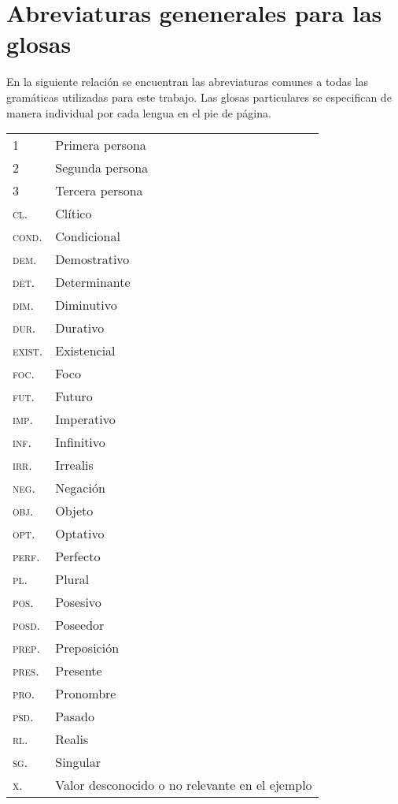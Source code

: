 \section*{Abreviaturas genenerales para las glosas}

\noindent En la siguiente relación se encuentran las abreviaturas comunes a todas las gramáticas utilizadas para este trabajo. Las glosas particulares se especifican de manera individual por cada lengua en el pie de página.


\begin{table}[htbp]
      \begin{tabular}{ll}
      1     & Primera persona \\
      2     & Segunda persona \\
      3     & Tercera persona \\
      \textsc{cl}.   & Clítico \\
      \textsc{cond}. & Condicional \\
      \textsc{dem}.  & Demostrativo \\
      \textsc{det}.  & Determinante \\
      \textsc{dim}.  & Diminutivo \\
      \textsc{dur}.  & Durativo \\
      \textsc{exist}. & Existencial \\
      \textsc{foc}.  & Foco \\
      \textsc{fut}.  & Futuro \\
      \textsc{imp}.  & Imperativo \\
      \textsc{inf}.  & Infinitivo \\
      \textsc{irr}.  & Irrealis \\
      \textsc{neg}.  & Negación \\
      \textsc{obj}.  & Objeto \\
      \textsc{opt}.  & Optativo \\
      \textsc{perf}. & Perfecto \\
      \textsc{pl}.   & Plural \\
      \textsc{pos}.  & Posesivo \\
      \textsc{posd}. & Poseedor \\
      \textsc{prep}. & Preposición \\
      \textsc{pres}. & Presente \\
      \textsc{pro}.  & Pronombre \\
      \textsc{psd}.  & Pasado \\
      \textsc{rl}.   & Realis \\
      \textsc{sg}.   & Singular \\
      \textsc{x}.    & Valor desconocido o no relevante en el ejemplo \\
      \end{tabular}
    \label{glosas}
  \end{table}
